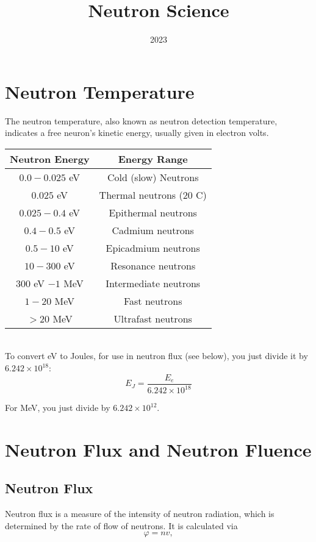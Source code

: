 \documentclass{article}
\title{Neutron Science}
\author{}
\date{2023}
\begin{document}
  \maketitle
  \begin{multicols*}{2}
    \section{Neutron Temperature}
    The neutron temperature, also known as neutron detection temperature,
    indicates a free neuron's kinetic energy, usually given in electron volts.\\
    
    \begin{tabular}{|c|c|}
      \hline
      \textbf{Neutron Energy} & \textbf{Energy Range} \\
      \hline
      $0.0 - 0.025$ eV & Cold (slow) Neutrons \\
      $0.025$ eV & Thermal neutrons ($20$ C) \\
      $0.025-0.4$ eV & Epithermal neutrons \\
      $0.4-0.5$ eV & Cadmium neutrons \\
      $0.5-10$ eV & Epicadmium neutrons \\
      $10-300$ eV & Resonance neutrons \\
      $300$ eV $- 1$ MeV & Intermediate neutrons \\
      $1-20$ MeV & Fast neutrons \\
      $> 20$ MeV & Ultrafast neutrons \\
      \hline
    \end{tabular}\\

    To convert eV to Joules, for use in neutron flux (see below), you just
    divide it by $6.242 \times 10^{18}$:
    \[
      E_J = \frac{E_e}{6.242\times10^{18}}
    \]

    For MeV, you just divide by $6.242\times10^{12}$.


    \section{Neutron Flux and Neutron Fluence}
    \subsection{Neutron Flux}
    Neutron flux is a measure of the intensity of neutron radiation,
    which is determined by the rate of flow of neutrons. It is calculated
    via
    \[
      \varphi = nv,
    \] 


\end{multicols*}
\end{document}

